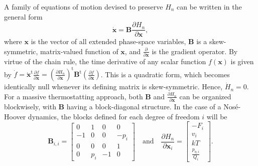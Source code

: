 \documentclass[
aip,
jcp,
reprint,
]{revtex4-1}
\newcommand{\mt}[1]{\boldsymbol{\mathbf{#1}}}          %
\newcommand{\vt}[1]{\boldsymbol{\mathbf{#1}}}          %
\newcommand{\tr}[1]{#1^\text{t}}                       %
\newcommand{\diff}[2]{\frac{\partial #2}{\partial #1}} %
\newcommand{\grad}[2]{\diff{#1}{#2}}                   %
\newcommand{\nn}{n}
\begin{document}
A family of equations of motion devised to preserve $H_\nn$ can be written in the general form \cite{Sergi_2001}
\begin{equation}
\label{eq:general conservative phase-space flow}
\dot{\vt x} = {\mt B} \grad{\vt x}{H_\nn},
\end{equation}
where $\vt x$ is the vector of all extended phase-space variables, $\mt B$ is a skew-symmetric, matrix-valued function of $\vt x$, and $\grad{\vt x}{}$ is the gradient operator.
By virtue of the chain rule, the time derivative of any scalar function $f(\vt x)$ is given by $\dot f = \tr{\dot{\vt x}}\grad{\vt x}{f} = \tr{(\grad{\vt x}{H_\nn})} \tr{\mt B} (\grad{\vt x}{f})$.
This is a quadratic form, which becomes identically null whenever its defining matrix is skew-symmetric.
Hence, $\dot{H}_\nn = 0$.
For a massive thermostatting approach, both $\mt B$ and $\grad{\vt x}{H_\nn}$ can be organized blockwisely, with $\mt B$ having a block-diagonal structure.
In the case of a Nos\'e-Hoover dynamics, the blocks defined for each degree of freedom $i$ will be
\begin{equation}
\label{eq:regulated dynamics diagonal block}
{\mt B}_{i,i} =
\left[\begin{array}{cccc}
	0  &  1  & 0  &  0   \\
	-1 &  0  & 0  & -p_i \\
	0  &  0  & 0  &  1   \\
	0  & p_i & -1 &  0
\end{array}\right]
\quad \mathrm{and} \quad
\grad{\vt x_i}{H_\nn} =
\left[\begin{array}{c}
	         -F_i          \\
	         v_i           \\
	         k T           \\
	\frac{p_{\eta,i}}{Q_i}
\end{array}\right].
\end{equation}
\end{document}

